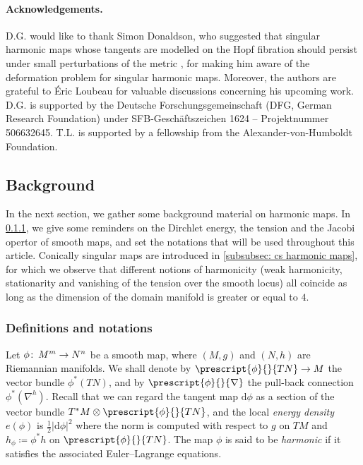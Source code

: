 \documentclass{article}
\numberwithin{equation}{section}        %
\theoremstyle{bfnote}
\theoremstyle{definition}
\theoremstyle{bfremark}
\newcommand{\col}{\colon \thinspace}        %
\newcommand{\diff}{\mathrm{d}}                      %
\begin{document}
\paragraph{Acknowledgements.} D.G. would like to thank Simon Donaldson, who suggested that singular harmonic maps whose tangents are modelled on the Hopf fibration should persist under small perturbations of the metric \cite{Donaldson2021talk}, for making him aware of the deformation problem for singular harmonic maps. Moreover, the authors are grateful to \'Eric Loubeau for valuable discussions concerning his upcoming work.  D.G. is supported by the Deutsche Forschungsgemeinschaft (DFG, German Research Foundation) under SFB-Geschäftszeichen 1624 – Projektnummer 506632645. T.L. is supported by a fellowship from the Alexander-von-Humboldt Foundation.


    \subsection{Background}     \label{subsec: background}

In the next section, we gather some background material on harmonic maps. In \cref{subsubsec: definitions and notations}, we give some reminders on the Dirchlet energy, the tension and the Jacobi opertor of smooth maps, and set the notations that will be used throughout this article. Conically singular maps are introduced in \cref{subsubsec: cs harmonic maps}, for which we observe that different notions of harmonicity (weak harmonicity, stationarity and vanishing of the tension over the smooth locus) all coincide as long as the dimension of the domain manifold is greater or equal to $4$.


    \subsubsection{Definitions and notations}       \label{subsubsec: definitions and notations}

Let $\phi \col M^m \rightarrow N^n$ be a smooth map, where $(M,g)$ and $(N,h)$ are Riemannian manifolds. We shall denote by $\prescript{\phi}{}{TN} \rightarrow M$ the vector bundle $\phi^* (TN)$, and by $\prescript{\phi}{}{\nabla}$ the pull-back connection $\phi^*(\nabla^{h})$. Recall that we can regard the tangent map $\diff\phi$ as a section of the vector bundle $T^*M \otimes \prescript{\phi}{}{TN}$, and the local \emph{energy density} $e(\phi)$ is $\frac{1}{2} |\diff\phi|^2$ where the norm is computed with respect to $g$ on $TM$ and $h_\phi \coloneqq \phi^* h$ on $\prescript{\phi}{}{TN}$. The map $\phi$ is said to be \emph{harmonic} if it satisfies the associated Euler--Lagrange equations. 
\end{document}
